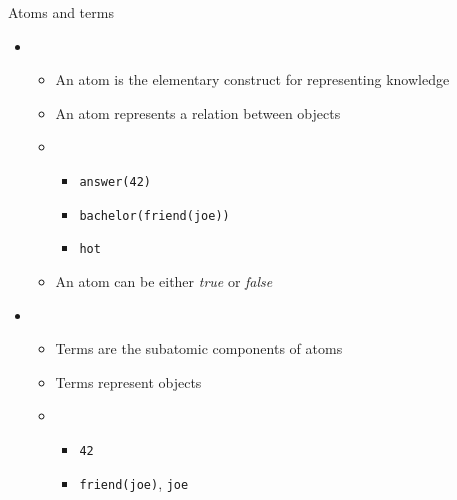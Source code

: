 \begin{frame}[c]{Atoms and terms}
  \begin{itemize}
  \item<1-> 
    \begin{itemize}
    \item An atom is the elementary construct for representing knowledge
    \item An atom represents a relation between objects
      \smallskip
    \item {}
      \begin{itemize}\small
      \item \lstinline{answer(42)}
      \item \lstinline{bachelor(friend(joe))}
      \item \lstinline{hot}
      \end{itemize}
    \item An atom can be either \textit{true} or \textit{false}
    \end{itemize}
    \medskip
  \item<2-> 
    \begin{itemize}
    \item Terms are the subatomic components of atoms
    \item Terms represent objects
      \smallskip
    \item {}
      \begin{itemize}\small
      \item \lstinline{42}
      \item \lstinline{friend(joe)}, \lstinline{joe}
      \end{itemize}
    \end{itemize}
  \end{itemize}
\end{frame}
%
